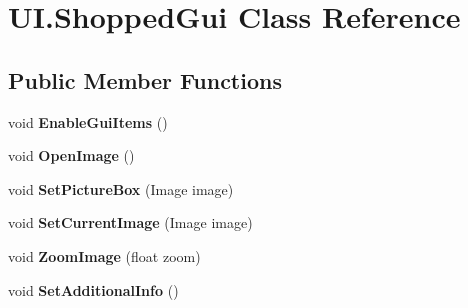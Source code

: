 \hypertarget{class_u_i_1_1_shopped_gui}{
\section{UI.ShoppedGui Class Reference}
\label{class_u_i_1_1_shopped_gui}
}
\subsection*{Public Member Functions}
\begin{DoxyCompactItemize}
\item 
\hypertarget{class_u_i_1_1_shopped_gui_a9a54c136cc258deace90c6afb2249874}{
void {\bfseries EnableGuiItems} ()}
\label{class_u_i_1_1_shopped_gui_a9a54c136cc258deace90c6afb2249874}

\item 
\hypertarget{class_u_i_1_1_shopped_gui_a5a53ff8857e36117991156d267dc74f4}{
void {\bfseries OpenImage} ()}
\label{class_u_i_1_1_shopped_gui_a5a53ff8857e36117991156d267dc74f4}

\item 
\hypertarget{class_u_i_1_1_shopped_gui_abe26e4f1c98122536f63936ca8d26c25}{
void {\bfseries SetPictureBox} (Image image)}
\label{class_u_i_1_1_shopped_gui_abe26e4f1c98122536f63936ca8d26c25}

\item 
\hypertarget{class_u_i_1_1_shopped_gui_a36ca444ddfb9ba2312cf4bcd35ab2335}{
void {\bfseries SetCurrentImage} (Image image)}
\label{class_u_i_1_1_shopped_gui_a36ca444ddfb9ba2312cf4bcd35ab2335}

\item 
\hypertarget{class_u_i_1_1_shopped_gui_add911c1f67662901046a206b15650c56}{
void {\bfseries ZoomImage} (float zoom)}
\label{class_u_i_1_1_shopped_gui_add911c1f67662901046a206b15650c56}

\item 
\hypertarget{class_u_i_1_1_shopped_gui_a95e786417d11460cc86e53367743db17}{
void {\bfseries SetAdditionalInfo} ()}
\label{class_u_i_1_1_shopped_gui_a95e786417d11460cc86e53367743db17}

\end{DoxyCompactItemize}
